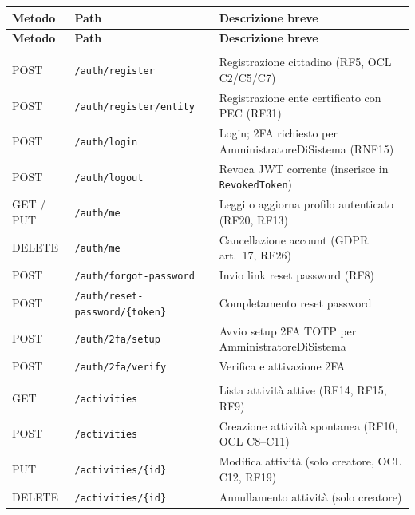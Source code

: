 \documentclass[11pt,a4paper]{article}
\newcommand{\code}[1]{\texttt{\small#1}}
\begin{document}
  \begin{small}
  \begin{longtable}{>{\centering\arraybackslash}p{1.6cm} p{7.2cm} p{6.2cm}}
  \toprule
  \rowcolor{headerBg}\color{white}\textbf{Metodo} & \color{white}\textbf{Path} &
  \color{white}\textbf{Descrizione breve} \\
  \midrule
  \endfirsthead
  \toprule
  \rowcolor{headerBg}\color{white}\textbf{Metodo} & \color{white}\textbf{Path} &
  \color{white}\textbf{Descrizione breve} \\
  \midrule
  \endhead
  \multicolumn{3}{l}{\textbf{Autenticazione}} \\
  \midrule
  \rowcolor{rowAlt}POST & \code{/auth/register} & Registrazione cittadino (RF5, OCL C2/C5/C7) \\
  POST & \code{/auth/register/entity} & Registrazione ente certificato con PEC (RF31) \\
  \rowcolor{rowAlt}POST & \code{/auth/login} & Login; 2FA richiesto per AmministratoreDiSistema (RNF15) \\
  POST & \code{/auth/logout} & Revoca JWT corrente (inserisce in \code{RevokedToken}) \\
  \rowcolor{rowAlt}GET / PUT & \code{/auth/me} & Leggi o aggiorna profilo autenticato (RF20, RF13) \\
  DELETE & \code{/auth/me} & Cancellazione account (GDPR art.\ 17, RF26) \\
  \rowcolor{rowAlt}POST & \code{/auth/forgot-password} & Invio link reset password (RF8) \\
  POST & \code{/auth/reset-password/\{token\}} & Completamento reset password \\
  \rowcolor{rowAlt}POST & \code{/auth/2fa/setup} & Avvio setup 2FA TOTP per AmministratoreDiSistema \\
  POST & \code{/auth/2fa/verify} & Verifica e attivazione 2FA \\
  \midrule
  \multicolumn{3}{l}{\textbf{Attivit\`{a}}} \\
  \midrule
  \rowcolor{rowAlt}GET & \code{/activities} & Lista attivit\`{a} attive (RF14, RF15, RF9) \\
  POST & \code{/activities} & Creazione attivit\`{a} spontanea (RF10, OCL C8--C11) \\
  \rowcolor{rowAlt}PUT & \code{/activities/\{id\}} & Modifica attivit\`{a} (solo creatore, OCL C12, RF19) \\
  DELETE & \code{/activities/\{id\}} & Annullamento attivit\`{a} (solo creatore) \\

\end{longtable}
\end{small}
\end{document}
